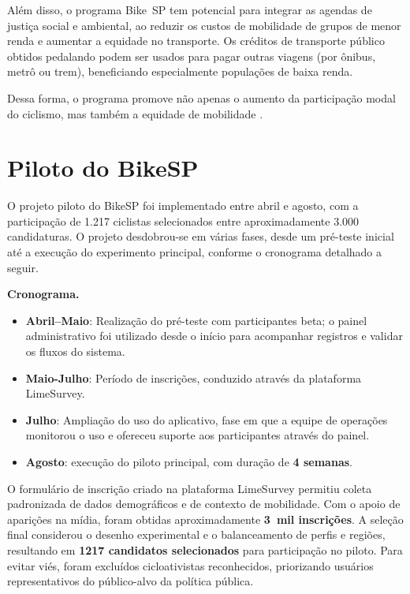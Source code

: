Além disso, o programa Bike~SP tem potencial para integrar as agendas de justiça
social e ambiental, ao reduzir os custos de mobilidade de grupos de menor renda
e aumentar a equidade no transporte. Os créditos de transporte público obtidos
pedalando podem ser usados para pagar outras viagens (por ônibus, metrô ou trem),
beneficiando especialmente populações de baixa renda.

Dessa forma, o programa promove não apenas o aumento da participação modal do
ciclismo, mas também a equidade de mobilidade \citep{vanoutrive2020, jeekel2017}.

\section{Piloto do BikeSP}
\label{sec:piloto-bikesp}
O projeto piloto do BikeSP foi implementado entre abril e agosto, com a participação de 1.217 ciclistas selecionados entre aproximadamente 3.000 candidaturas. O projeto desdobrou-se em várias fases, desde um pré-teste inicial até a execução do experimento principal, conforme o cronograma detalhado a seguir.

\textbf{Cronograma.} \begin{itemize}
      \item \textbf{Abril--Maio}: Realização do pré-teste com participantes beta; o 
      painel administrativo foi utilizado desde o início para acompanhar registros e validar os fluxos do sistema.
      \item \textbf{Maio-Julho}: Período de inscrições, conduzido através da plataforma LimeSurvey.
      \item \textbf{Julho}: Ampliação do uso do aplicativo, fase em que a equipe de operações monitorou o uso e ofereceu suporte aos participantes através do painel.
      \item \textbf{Agosto}: execução do piloto principal, com duração de \textbf{4 
      semanas}.
    \end{itemize}

O formulário de inscrição criado na plataforma LimeSurvey permitiu
coleta padronizada de dados demográficos e de contexto de mobilidade. Com o
apoio de aparições na mídia, foram obtidas aproximadamente \textbf{3~mil
inscrições}. A seleção final considerou o desenho experimental e o balanceamento
de perfis e regiões, resultando em \textbf{1217 candidatos selecionados} para
participação no piloto. Para evitar viés, foram excluídos cicloativistas
reconhecidos, priorizando usuários representativos do público-alvo da política
pública.


